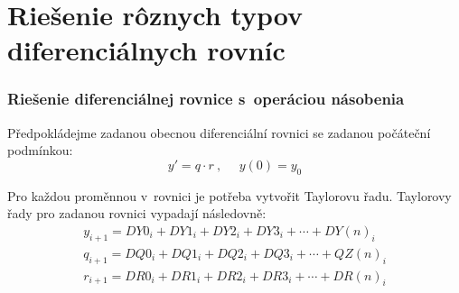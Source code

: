 





\chapter{Riešenie rôznych typov diferenciálnych rovníc}

\subsection{Riešenie diferenciálnej rovnice s~operáciou násobenia} \label{priloha_nasobenie}
Předpokládejme zadanou obecnou diferenciální rovnici se zadanou počáteční podmínkou:
\begin{equation}
\label{nasobeni_integrace}
y'= q \cdot r~,~~~~~~y(0)=y_0
\end{equation}

Pro každou proměnnou v~rovnici je potřeba vytvořit Taylorovu řadu. Taylorovy řady pro zadanou rovnici vypadají následovně:
\begin{eqnarray}
y_{i+1} = DY0_i + DY1_i + DY2_i + DY3_i + \cdots + DY(n)_i\\
q_{i+1} = DQ0_i + DQ1_i + DQ2_i + DQ3_i + \cdots + QZ(n)_i\\
r_{i+1} = DR0_i + DR1_i + DR2_i + DR3_i + \cdots + DR(n)_i
\end{eqnarray}

